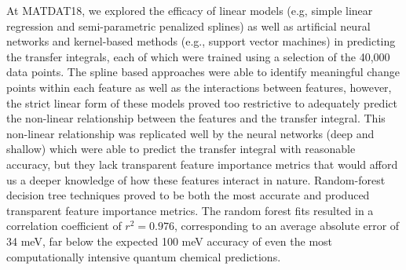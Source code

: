 \documentclass[12pt]{article}
\begin{document}
At MATDAT18, we explored the efficacy of linear models (e.g, simple linear regression and semi-parametric penalized splines) as well as artificial neural networks and kernel-based methods (e.g., support vector machines) in predicting the transfer integrals, each of which were trained using a selection of the 40,000 data points.  The spline based approaches were able to identify meaningful change points within each feature as well as the interactions between features, however, the strict linear form of these models proved too restrictive to adequately predict the non-linear relationship between the features and the transfer integral.  This non-linear relationship was replicated well by the neural networks (deep and shallow) which were able to predict the transfer integral with reasonable accuracy, but they lack transparent feature importance metrics that would afford us a deeper knowledge of how these features interact in nature.  Random-forest decision tree techniques proved to be both the most accurate and produced transparent feature importance metrics.  The random forest fits resulted in a correlation coefficient of $r^{2} = 0.976$, corresponding to an average absolute error of 34 meV, far below the expected 100 meV accuracy of even the most computationally intensive quantum chemical predictions.


\end{document}

